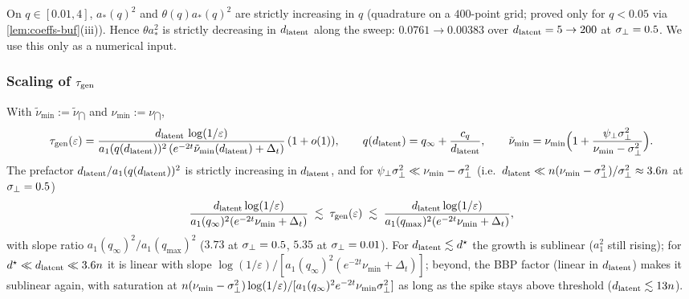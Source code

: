 \begin{remark}\label{rem:astar-mono-buf}
On $q\in[0.01,4]$, $a_*(q)^2$ and $\theta(q)a_*(q)^2$ are strictly increasing in $q$ (quadrature on a $400$-point grid; proved only for $q<0.05$ via \cref{lem:coeffs-buf}(iii)). Hence $\theta a_*^2$ is strictly decreasing in $d_{\mathrm{latent}}$ along the sweep: $0.0761\to0.00383$ over $d_{\mathrm{latent}}=5\to200$ at $\sigma_{\perp}=0.5$. We use this only as a numerical input.
\end{remark}

\subsubsection{Scaling of $\tau_{\mathrm{gen}}$}

\begin{proposition}\label{prop:taugen-buf}
With $\tilde\nu_{\min}:=\tilde\nu_{\dint}$ and $\nu_{\min}:=\nu_{\dint}$,
\begin{equation}
\tau_{\mathrm{gen}}(\varepsilon)=\frac{d_{\mathrm{latent}}\,\log(1/\varepsilon)}{a_1(q(d_{\mathrm{latent}}))^2\,(e^{-2t}\tilde\nu_{\min}(d_{\mathrm{latent}})+\Delta_t)}\,(1+o(1)),\qquad q(d_{\mathrm{latent}})=q_\infty+\frac{c_q}{d_{\mathrm{latent}}},\qquad \tilde\nu_{\min}=\nu_{\min}\Bigl(1+\frac{\psi_\perp\sigma_{\perp}^2}{\nu_{\min}-\sigma_{\perp}^2}\Bigr).
\label{eq:taugen-buf}
\end{equation}
The prefactor $d_{\mathrm{latent}}/a_1(q(d_{\mathrm{latent}}))^2$ is strictly increasing in $d_{\mathrm{latent}}$, and for $\psi_\perp\sigma_{\perp}^2\ll\nu_{\min}-\sigma_{\perp}^2$ (i.e.\ $d_{\mathrm{latent}}\ll n(\nu_{\min}-\sigma_{\perp}^2)/\sigma_{\perp}^2\approx3.6n$ at $\sigma_{\perp}=0.5$)
\begin{equation}
\frac{d_{\mathrm{latent}}\log(1/\varepsilon)}{a_1(q_\infty)^2(e^{-2t}\nu_{\min}+\Delta_t)}\;\lesssim\;\tau_{\mathrm{gen}}(\varepsilon)\;\lesssim\;\frac{d_{\mathrm{latent}}\log(1/\varepsilon)}{a_1(q_{\max})^2(e^{-2t}\nu_{\min}+\Delta_t)},
\label{eq:taugen-sandwich-buf}
\end{equation}
with slope ratio $a_1(q_\infty)^2/a_1(q_{\max})^2$ ($3.73$ at $\sigma_{\perp}=0.5$, $5.35$ at $\sigma_{\perp}=0.01$). For $d_{\mathrm{latent}}\lesssim d^\star$ the growth is sublinear ($a_1^2$ still rising); for $d^\star\ll d_{\mathrm{latent}}\ll3.6n$ it is linear with slope $\log(1/\varepsilon)/[a_1(q_\infty)^2(e^{-2t}\nu_{\min}+\Delta_t)]$; beyond, the BBP factor (linear in $d_{\mathrm{latent}}$) makes it sublinear again, with saturation at $n(\nu_{\min}-\sigma_{\perp}^2)\log(1/\varepsilon)/[a_1(q_\infty)^2e^{-2t}\nu_{\min}\sigma_{\perp}^2]$ as long as the spike stays above threshold ($d_{\mathrm{latent}}\lesssim13n$).
\end{proposition}
